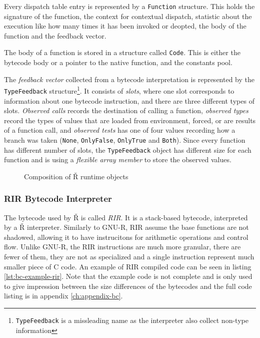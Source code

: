 Every dispatch table entry is represented by a \texttt{Function} structure. This holds the signature of the function, the context for contextual dispatch, statistic about the execution like how many times it has been invoked or deopted, the body of the function and the feedback vector.

The body of a function is stored in a structure called \texttt{Code}. This is either the bytecode body or a pointer to the native function, and the constants pool.

The \textit{feedback vector} collected from a bytecode interpretation is represented by the \texttt{TypeFeedback} structure\footnote{\texttt{TypeFeedback} is a missleading name as the interpreter also collect non-type information}. It consists of \textit{slots}, where one slot corresponds to information about one bytecode instruction, and there are three different types of slots. \textit{Observed calls} records the destination of calling a function, \textit{observed types} record the types of values that are loaded from environment, forced, or are results of a function call, and \textit{observed tests} has one of four values recording how a branch was taken (\texttt{None}, \texttt{OnlyFalse}, \texttt{OnlyTrue} and \texttt{Both}). Since every function has different number of slots, the \texttt{TypeFeedback} object has different size for each function and is using a \textit{flexible array member}\cite{flexible-array} to store the observed values.

\begin{figure}
	\centering
	\caption{Composition of Ř runtime objects}\label{fig:rsh-composition}
\end{figure}

\subsubsection*{RIR Bytecode Interpreter}

The bytecode used by Ř is called \textit{RIR}. It is a stack-based bytecode, interpreted by a Ř interpreter. Similarly to GNU-R, RIR assume the base functions are not shadowed, allowing it to have instrucitons for arithmetic operations and control flow. Unlike GNU-R, the RIR instructions are much more granular, there are fewer of them, they are not as specialized and a single instruction represent much smaller piece of C code. An example of RIR compiled code can be seen in listing \ref{lst:bc-example-rir}. Note that the example code is not complete and is only used to give impression between the size differences of the bytecodes and the full code listing is in appendix \ref{ch:appendix-bc}.

